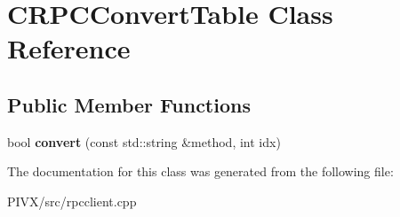 \hypertarget{class_c_r_p_c_convert_table}{}\section{C\+R\+P\+C\+Convert\+Table Class Reference}
\label{class_c_r_p_c_convert_table}
\subsection*{Public Member Functions}
\begin{DoxyCompactItemize}
\item 
\mbox{\label{class_c_r_p_c_convert_table_a034b770cb03e79074111b85eba889e58}} 
bool {\bfseries convert} (const std\+::string \&method, int idx)
\end{DoxyCompactItemize}


The documentation for this class was generated from the following file\+:\begin{DoxyCompactItemize}
\item 
P\+I\+V\+X/src/rpcclient.\+cpp\end{DoxyCompactItemize}
